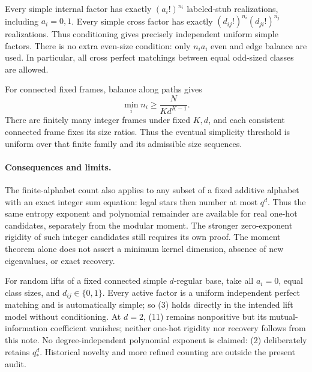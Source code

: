 \documentclass[11pt]{article}
\begin{document}
Every simple internal factor has exactly $(a_i!)^{n_i}$ labeled-stub
realizations, including $a_i=0,1$. Every simple cross factor has exactly
$(d_{ij}!)^{n_i}(d_{ji}!)^{n_j}$ realizations. Thus conditioning gives
precisely independent uniform simple factors. There is no extra even-size
condition: only $n_i a_i$ even and edge balance are used. In particular,
all cross perfect matchings between equal odd-sized classes are allowed.

For connected fixed frames, balance along paths gives
\[
 \min_i n_i\geq \frac{N}{K d^{K-1}}.
\]
There are finitely many integer frames
under fixed $K,d$, and each consistent connected frame fixes its size
ratios. Thus the eventual simplicity threshold is uniform over that
finite family and its admissible size sequences.

\paragraph{Consequences and limits.}
The finite-alphabet count also applies to any subset of a fixed additive
alphabet with an exact integer sum equation: legal stars then number at
most $q^d$. Thus the same entropy exponent and polynomial remainder are
available for real one-hot candidates, separately from the modular moment.
The stronger zero-exponent rigidity of such integer candidates still
requires its own proof. The moment theorem alone does not assert a
minimum kernel dimension, absence of new eigenvalues, or exact recovery.

For random lifts of a fixed connected simple $d$-regular base, take all
$a_i=0$, equal class sizes, and $d_{ij}\in\{0,1\}$. Every active factor
is a uniform independent perfect matching and is automatically simple;
so (3) holds directly in the intended lift model without conditioning.
At $d=2$, (11) remains nonpositive but its mutual-information coefficient
vanishes; neither one-hot rigidity nor recovery follows from this note.
No degree-independent polynomial exponent is claimed: (2) deliberately
retains $q_*^d$. Historical novelty and more refined counting are outside
the present audit.
\end{document}
